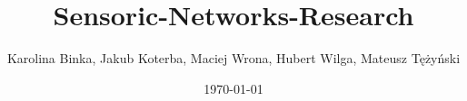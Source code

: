 \documentclass[a4paper, 12pt, leqno]{book} %
\begin{document}
\title{Sensoric-Networks-Research}
\author{Karolina Binka, Jakub Koterba, Maciej Wrona, Hubert Wilga, Mateusz Tężyński}
\date{\today} 
\maketitle %
\end{document}
